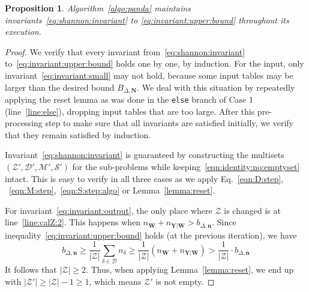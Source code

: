 \documentclass[10pt,a4paper]{article}
\newtheorem{proposition}{Proposition}[section]
\newcommand{\calM}{\mathcal M}
\newcommand{\calS}{\mathcal S}
\newcommand{\calD}{\mathcal D}
\newcommand{\calZ}{\mathcal Z}
\begin{document}
\begin{proposition}
Algorithm~\ref{algo:panda} maintains
invariants~\eqref{eq:shannon:invariant} to \eqref{eq:invariant:upper:bound} throughout its
execution.
\label{prop:panda:invariants}
\end{proposition}
\begin{proof}
  We verify that every invariant from~\eqref{eq:shannon:invariant}
  to~\eqref{eq:invariant:upper:bound} holds one by one, by induction. For the input, only
  invariant~\eqref{eq:invariant:small} may not hold, because some input tables may be larger than
  the desired bound $B_{\Delta,\bm N}$. We deal with this situation by repeatedly applying
  the reset lemma  as was done in the {\tt else} branch of Case 1 (line~\ref{line:else}), dropping input tables
  that are too large. After this pre-processing step to make sure that all invariants are
  satisfied initially, we verify that they remain satisfied by induction.

  Invariant~\eqref{eq:shannon:invariant} is guaranteed by constructing the multisets
  $(\calZ', \calD', \calM', \calS')$ for the sub-problems while keeping~\eqref{eqn:identity:no:emptyset}
  intact. This is easy to verify in all three cases as we apply Eq.~\eqref{eqn:D:step},
  ~\eqref{eqn:M:step},~\eqref{eqn:S:step:algo} or Lemma~\ref{lemma:reset}.

  For invariant~\ref{eq:invariant:output}, the only place where $\calZ$ is changed is
  at line~\ref{line:calZ:2}. This happens when $n_{\bm W}+n_{\bm Y|\bm W}>b_{\Delta,\bm n}$.
  Since inequality~\eqref{eq:invariant:upper:bound} holds (at the previous iteration),
  we have
  \[
    b_{\Delta,\bm n}
    \geq \frac{1}{|\calZ|}\sum_{\delta\in\calD}n_\delta
    \geq \frac{1}{|\calZ|}(n_{\bm W}+n_{\bm Y|\bm W})
    > \frac{1}{|\calZ|} \cdot b_{\Delta,\bm n}
  \]
  It follows that $|\calZ| \geq 2$. Thus, when applying Lemma~\ref{lemma:reset}, we end up
  with $|\calZ'| \geq |\calZ|-1 \geq 1$, which means $\calZ'$ is not empty.


\end{proof}
\end{document}
